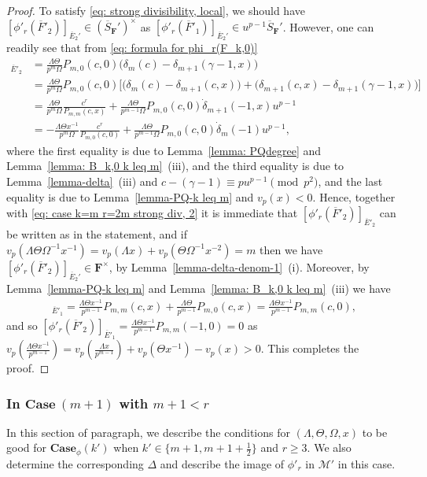 \documentclass[11pt]{amsart}
\theoremstyle{definition}
\numberwithin{equation}{subsection}
\theoremstyle{plain}
\theoremstyle{plain}
\theoremstyle{plain}
\theoremstyle{plain}
\theoremstyle{plain}
\theoremstyle{plain}
\theoremstyle{plain}
\theoremstyle{plain}
\theoremstyle{plain}
\theoremstyle{plain}
\theoremstyle{plain}
\theoremstyle{plain}
\theoremstyle{definition}
\theoremstyle{definition}
\theoremstyle{definition}
\theoremstyle{remark}
\renewcommand{\(}{\textup{(}}
\renewcommand{\)}{\textup{)}}
\newcommand{\F}{\mathbf{F}}
\newcommand{\barS}{\overline{S}}
\newcommand{\cM}{\mathcal{M}}
\newcommand{\barE}{\overline{E}}
\newcommand{\barF}{\overline{F}}
\begin{document}
\begin{proof}
To satisfy \eqref{eq: strong divisibility, local}, we should have $[\phi'_r(\barF'_2)]_{\barE_2'}\in (\barS_\F')^\times$ as $[\phi'_r(\barF'_1)]_{\barE_2'}\in u^{p-1}\barS_\F'$. However, one can readily see that from \eqref{eq: formula for phi_r(F_k,0)}
\begin{align*}
[\phi'_r(\barF'_{m,0})]_{\barE'_2}&=\frac{\Lambda\Theta}{p^m\Omega}
      P_{m,0}(c,0)\big(\delta_m(c)-\delta_{m+1}(\gamma-1,x)\big)\\
      &=\frac{\Lambda\Theta}{p^m\Omega}
      P_{m,0}(c,0)\big[\big(\delta_m(c)-\delta_{m+1}(c,x)\big) +\big(\delta_{m+1}(c,x)-\delta_{m+1}(\gamma-1,x)\big)\big]\\
      &=\frac{\Lambda\Theta}{p^m\Omega} \frac{c^r}{P_{m,m}(c,x)} + \frac{\Lambda\Theta}{p^{m-1}\Omega} P_{m,0}(c,0)\dot{\delta}_{m+1}(-1,x)u^{p-1}\\
      &=-\frac{\Lambda\Theta x^{-1}}{p^m\Omega} \frac{c^r}{P_{m,0}(c,0)} + \frac{\Lambda\Theta}{p^{m-1}\Omega} P_{m,0}(c,0)\dot{\delta}_m(-1)u^{p-1},
  \end{align*}
where the first equality is due to Lemma~\ref{lemma: PQdegree} and Lemma~\ref{lemma: B_k,0 k leq m}~(iii), and the third equality is due to Lemma~\ref{lemma-delta}~(iii) and $c-(\gamma-1)\equiv pu^{p-1}\pmod{p^2}$, and the last equality is due to Lemma~\ref{lemma-PQ-k leq m} and $v_p(x)<0$. Hence, together with \eqref{eq: case k=m r=2m strong div, 2} it is immediate that $[\phi'_r(\barF'_2)]_{\barE'_2}$ can be written as in the statement, and if 
$v_p(\Lambda\Theta\Omega^{-1}x^{-1})=v_p(\Lambda x)+v_p(\Theta\Omega^{-1}x^{-2})=m$ then we have $[\phi'_r(\barF'_2)]_{\barE_2'}\in \F^\times$, by Lemma~\ref{lemma-delta-denom-1}~(i). Moreover, by Lemma~\ref{lemma-PQ-k leq m} and Lemma~\ref{lemma: B_k,0 k leq m}~(iii) we have
\begin{align*}
[\phi'_r(\barF'_2)]_{\barE'_1}=\frac{\Lambda\Theta x^{-1} }{p^{m-1}}P_{m,m}(c,x)+\frac{\Lambda\Theta}{p^{m-1}}P_{m,0}(c,x)=\frac{\Lambda\Theta x^{-1}}{p^{m-1}}P_{m,m}(c,0),
\end{align*}
and so $[\phi'_r(\barF'_2)]_{\barE'_1}= \frac{\Lambda\Theta x^{-1}}{p^{m-1}}P_{m,m}(-1,0)=0$ as $v_p(\frac{\Lambda\Theta x^{-1}}{p^{m-1}})=v_p(\frac{\Lambda x}{p^{m-1}})+v_p(\Theta x^{-1})-v_p(x)>0$. This completes the proof.
\end{proof}




\subsubsection{\textbf{In $\mathbf{Case}~(m+1)$ with $m+1<r$}}
In this section of paragraph, we describe the conditions for $(\Lambda,\Theta,\Omega,x)$ to be good for $\mathbf{Case}_\phi(k')$ when $k'\in\{m+1,m+1+\frac{1}{2}\}$ and $r\geq 3$. We also determine the corresponding $\Delta$ and describe the image of $\phi'_r$ in $\cM'$ in this case.
\end{document}
